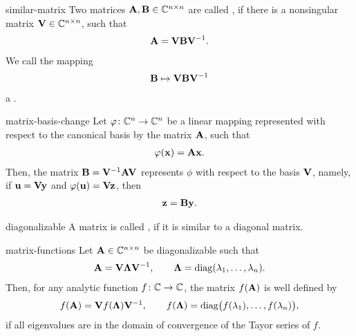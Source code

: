 \begin{Definition}{similar-matrix}
  Two matrices $\mathbf A,\mathbf B\in\mathbb C^{n\times n}$ are called , if there is a nonsingular matrix $\mathbf V\in\mathbb C^{n\times n}$, such that
  \begin{gather}
      \mathbf A = \mathbf V \mathbf B \mathbf V^{-1}.
  \end{gather}
  We call the mapping
  \begin{gather}
      \mathbf B \mapsto \mathbf V \mathbf B \mathbf V^{-1}
  \end{gather}
  a .
\end{Definition}

\begin{Lemma}{matrix-basis-change}
  Let $\varphi\colon \mathbb C^n\to \mathbb C^n$ be a linear mapping represented with
  respect to the canonical basis by the matrix $\mathbf A$, such that
  \begin{gather}
    \varphi(\mathbf x) = \mathbf A \mathbf x.
  \end{gather}
  Then, the matrix $\mathbf B = \mathbf V^{-1}\mathbf A\mathbf V$ represents $\phi$
  with respect to the basis $\mathbf V$, namely, if $\mathbf u = \mathbf V \mathbf y$ and
  $\varphi(\mathbf u) = \mathbf V \mathbf z$, then
  \begin{gather}
    \mathbf z = \mathbf B \mathbf y.
  \end{gather}
\end{Lemma}

\begin{Definition}{diagonalizable}
  A matrix is called , if it is similar to a diagonal matrix.
\end{Definition}

\begin{Theorem}{matrix-functions}
  Let $\mathbf A\in \mathbb C^{n\times n}$ be diagonalizable such that
  \begin{gather}
    \mathbf A = \mathbf V \boldsymbol\Lambda \mathbf V^{-1},
    \qquad \boldsymbol\Lambda = \operatorname{diag}(\lambda_1,\dots,\lambda_n).
  \end{gather}
  Then, for any analytic function $f\colon \mathbb C \to \mathbb C$, the matrix
  $f(\mathbf A)$ is well defined by
  \begin{gather}
    f(\mathbf A) = \mathbf V f(\boldsymbol\Lambda) \mathbf V^{-1},
    \qquad f(\boldsymbol\Lambda) = \operatorname{diag}\bigl(f(\lambda_1),\dots,f(\lambda_n)\bigr),
  \end{gather}
  if all eigenvalues are in the domain of convergence of the Tayor
  series of $f$.
\end{Theorem}

